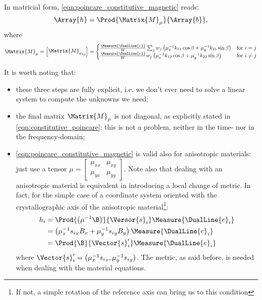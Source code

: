 \begin{enumerate}
  In matricial form, \eqref{eqn:poincare_constitutive_magnetic} reads:
  \begin{equation*}
    \Array{h} = \Prod{\Matrix{M}_\mu}{\Array{b}} ,
  \end{equation*}
  where
  \begin{equation} \label{eqn:constitutive_poincare}
    \Matrix{M}_\mu = \begin{bmatrix}
      {\Matrix{M}_\mu}_{ij}
    \end{bmatrix} = \begin{cases}
      \frac{\Measure{\DualLine{e}}}{W} \sum_j w_j 
    \left( \mu_x^{-1} k_{11} \cos\beta + \mu_y^{-1} k_{21} \sin\beta
    \right) & \text{for $i = j$} \\
      \frac{\Measure{\DualLine{e}}}{W} w_j 
    \left( \mu_x^{-1} k_{12} \cos\beta + \mu_y^{-1} k_{22} \sin\beta
    \right) & \text{for $i \neq j$} \\
    \end{cases}
  \end{equation}
\end{enumerate}

It is worth noting that:
\begin{itemize}
\item
  these three steps are fully explicit, i.e. we
  don't ever need to solve a linear system to compute the unknowns we
  need;
\item
  the final matrix $\Matrix{M}_\mu$ is not diagonal, as
  explicitly stated in \eqref{eqn:constitutive_poincare}: this is not
  a problem, neither in the time- nor in the frequency-domain;
\item
  \eqref{eqn:poincare_constitutive_magnetic} is valid also for
  anisotropic materials: just use a tensor $\mu = \left[
  \begin{smallmatrix} \mu_{xx} & \mu_{xy} \\ \mu_{yx} & \mu_{yy}
  \end{smallmatrix} \right]$. Note also that dealing with an
  anisotropic material is equivalent in introducing a local change of
  metric. In fact, for the simple case of a coordinate system oriented
  with the crystallographic axis of the anisotropic
  material\footnote{If not, a simple rotation of the reference axis
  can bring us to this condition}:
  \begin{equation*} \begin{split}
    h_i & = \Prod{\left( \mu^{-1} \B \right)}{\Versor{s}_i} \Measure{\DualLine{e}_i} \\
        & = \left( \mu_x^{-1} {s_i}_x B_x + \mu_y^{-1} {s_i}_y B_y \right) \Measure{\DualLine{e}_i} \\
        & = \Prod{\B}{\Vector{s}'_i} \Measure{\DualLine{e}_i}
  \end{split} \end{equation*}
  where $\Vector{s}'_i = \left( \mu_x^{-1} {s_i}_x, \mu_y^{-1}
  {s_i}_y \right)$. The metric, as said before, is needed when dealing
  with the material equations.
\end{itemize}

